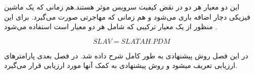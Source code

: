    این دو معیار هر دو در نقض کیفیت سرویس موثر هستند.هم زمانی که یک ماشین فیزیکی دچار اضافه باری می‌شود و هم زمانی که مهاجرتی صورت می‌گیرد. برای این منظور از یک معیار ترکیبی که شامل هر دو معیار است استفاده می‌شود
   \cite{num16}.

\begin{equation}
   SLAV = SLATAH.PDM
\end{equation}
   
   در این فصل روش پیشنهادی به طور کامل شرح داده شد. در فصل بعدی پارامترهای ارزیابی تعریف می­شود و روش پیشنهادی به کمک آنها مورد ارزیابی قرار می‌گیرد.
